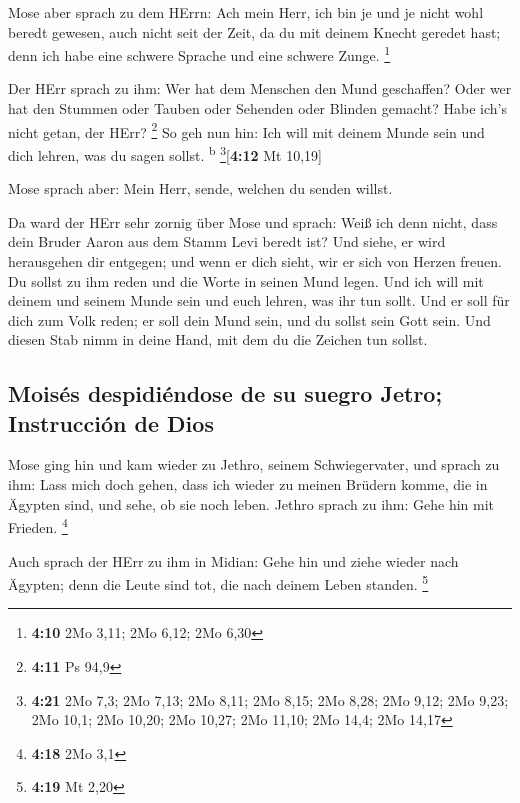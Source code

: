  Mose aber sprach zu dem HErrn: Ach mein Herr, ich bin je
und je nicht wohl beredt gewesen, auch nicht seit der Zeit, da du mit
deinem Knecht geredet hast; denn ich habe eine schwere Sprache und eine
schwere Zunge. \footnote{\textbf{4:10} 2Mo 3,11; 2Mo 6,12; 2Mo 6,30}

 Der HErr sprach zu ihm: Wer hat dem Menschen den Mund
geschaffen? Oder wer hat den Stummen oder Tauben oder Sehenden oder
Blinden gemacht? Habe ich's nicht getan, der HErr? \footnote{\textbf{4:11}
  Ps 94,9}  So geh nun hin: Ich will mit deinem Munde
sein und dich lehren, was du sagen sollst. \textsuperscript{b}
\footnote{\textbf{4:21} 2Mo 7,3; 2Mo 7,13; 2Mo 8,11; 2Mo 8,15; 2Mo 8,28;
  2Mo 9,12; 2Mo 9,23; 2Mo 10,1; 2Mo 10,20; 2Mo 10,27; 2Mo 11,10; 2Mo
  14,4; 2Mo 14,17}{[}\textbf{4:12} Mt 10,19{]}

 Mose sprach aber: Mein Herr, sende, welchen du senden
willst.

 Da ward der HErr sehr zornig über Mose und sprach: Weiß
ich denn nicht, dass dein Bruder Aaron aus dem Stamm Levi beredt ist?
Und siehe, er wird herausgehen dir entgegen; und wenn er dich sieht, wir
er sich von Herzen freuen.  Du sollst zu ihm reden und
die Worte in seinen Mund legen. Und ich will mit deinem und seinem Munde
sein und euch lehren, was ihr tun sollt.  Und er soll für
dich zum Volk reden; er soll dein Mund sein, und du sollst sein Gott
sein.  Und diesen Stab nimm in deine Hand, mit dem du die
Zeichen tun sollst.

\hypertarget{moisuxe9s-despidiuxe9ndose-de-su-suegro-jetro-instrucciuxf3n-de-dios}{%
\subsection{Moisés despidiéndose de su suegro Jetro; Instrucción de
Dios}\label{moisuxe9s-despidiuxe9ndose-de-su-suegro-jetro-instrucciuxf3n-de-dios}}

 Mose ging hin und kam wieder zu Jethro, seinem
Schwiegervater, und sprach zu ihm: Lass mich doch gehen, dass ich wieder
zu meinen Brüdern komme, die in Ägypten sind, und sehe, ob sie noch
leben. Jethro sprach zu ihm: Gehe hin mit Frieden. \footnote{\textbf{4:18}
  2Mo 3,1}

 Auch sprach der HErr zu ihm in Midian: Gehe hin und
ziehe wieder nach Ägypten; denn die Leute sind tot, die nach deinem
Leben standen. \footnote{\textbf{4:19} Mt 2,20}

